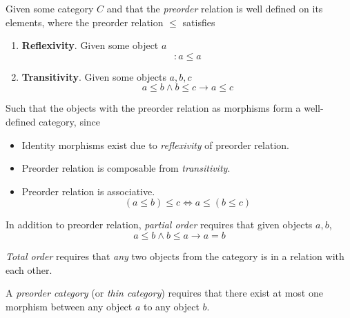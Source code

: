 \begin{definition}
    Given some category $C$ and that the \textit{preorder} relation is well defined on its elements, where the preorder relation $\le$ satisfies
    \begin{enumerate}
        \item \textbf{Reflexivity}. Given some object $a$
        \begin{equation}
            \colon a \le a
        \end{equation}
        \item \textbf{Transitivity}. Given some objects $a, b, c$
        \begin{equation}
            a \le b \land b \le c \to a \le c
        \end{equation}
    \end{enumerate}
    
    Such that the objects with the preorder relation as morphisms form a well-defined category, since
    \begin{itemize}
        \item Identity morphisms exist due to \textit{reflexivity} of preorder relation.
        \item Preorder relation is composable from \textit{transitivity}.
        \item Preorder relation is associative.
        \begin{equation}
            (a \le b) \le c \Leftrightarrow a \le (b \le c)
        \end{equation}
    \end{itemize}
\end{definition}

\begin{definition}
    In addition to preorder relation, \textit{partial order} requires that given objects $a, b$,
    \begin{equation}
        a \le b \land b \le a \to a = b
    \end{equation}
\end{definition}

\begin{definition}
    \textit{Total order} requires that \textit{any} two objects from the category is in a relation with each other.
\end{definition}

\begin{definition}
    A \textit{preorder category} (or \textit{thin category}) requires that there exist at most one morphism between any object $a$ to any object $b$.
\end{definition}


